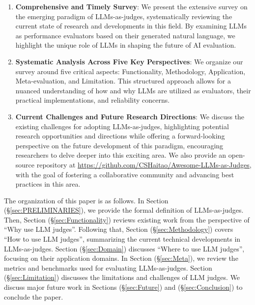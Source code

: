 \begin{enumerate} 
\item \textbf{Comprehensive and Timely Survey}: We present the extensive survey on the emerging paradigm of LLMs-as-judges, systematically reviewing the current state of research and developments in this field. By examining LLMs as performance evaluators based on their generated natural language, we highlight the unique role of LLMs in shaping the future of AI evaluation.

\item \textbf{Systematic Analysis Across Five Key Perspectives}: We organize our survey around five critical aspects: Functionality, Methodology, Application, Meta-evaluation, and Limitation. This structured approach allows for a nuanced understanding of how and why LLMs are utilized as evaluators, their practical implementations, and reliability concerns.

\item \textbf{Current Challenges and Future Research Directions}: We discuss the existing challenges for adopting LLMs-as-judges, highlighting potential research opportunities and directions while offering a forward-looking perspective on the future development of this paradigm, encouraging researchers to delve deeper into this exciting area. We also provide an open-source repository at \url{https://github.com/CSHaitao/Awesome-LLMs-as-Judges}, with the goal of fostering a collaborative community and advancing best practices in this area.
\end{enumerate}

The organization of this paper is as follows. In Section (\S\ref{sec:PRELIMINARIES}), we provide the formal definition of LLMs-as-judges. Then, Section (\S\ref{sec:Functionality}) reviews existing work from the perspective of ``Why use LLM judges''. Following that, Section (\S\ref{sec:Methodology}) covers ``How to use LLM judges'', summarizing the current technical developments in LLMs-as-judges. Section (\S\ref{sec:Domain}) discusses ``Where to use LLM judges'', focusing on their application domains. In Section (\S\ref{sec:Meta}), we review the metrics and benchmarks used for evaluating LLMs-as-judges. Section (\S\ref{sec:Limitation}) discusses the limitations and challenges of LLM judges. We discuss major future work in Sections (\S\ref{sec:Future})  and (\S\ref{sec:Conclusion}) to conclude the paper. 








